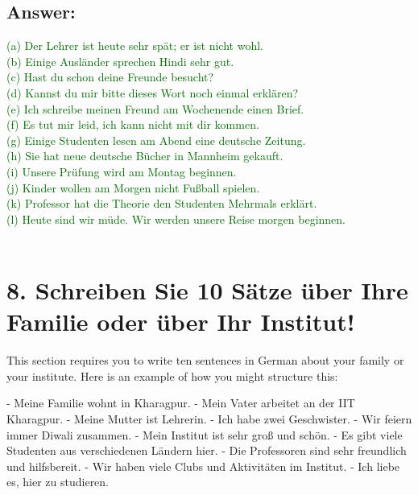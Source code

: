 \documentclass[a4paper,12pt]{article}
\begin{document}
\subsection*{Answer:}
\textcolor{darkgreen}{(a) Der Lehrer ist heute sehr spät; er ist nicht wohl.}\\
\textcolor{darkgreen}{(b) Einige Ausländer sprechen Hindi sehr gut.}\\
\textcolor{darkgreen}{(c) Hast du schon deine Freunde besucht?}\\
\textcolor{darkgreen}{(d) Kannst du mir bitte dieses Wort noch einmal erklären?}\\
\textcolor{darkgreen}{(e) Ich schreibe meinen Freund am Wochenende einen Brief.}\\
\textcolor{darkgreen}{(f) Es tut mir leid, ich kann nicht mit dir kommen.}\\
\textcolor{darkgreen}{(g) Einige Studenten lesen am Abend eine deutsche Zeitung.}\\
\textcolor{darkgreen}{(h) Sie hat neue deutsche Bücher in Mannheim gekauft.}\\
\textcolor{darkgreen}{(i) Unsere Prüfung wird am Montag beginnen.}\\
\textcolor{darkgreen}{(j) Kinder wollen am Morgen nicht Fußball spielen.}\\
\textcolor{darkgreen}{(k) Professor hat die Theorie den Studenten Mehrmals erklärt.}\\
\textcolor{darkgreen}{(l) Heute sind wir müde. Wir werden unsere Reise morgen beginnen.}\\
\

\vspace{1cm}

\section*{8. Schreiben Sie 10 Sätze über Ihre Familie oder über Ihr Institut!}

This section requires you to write ten sentences in German about your family or your institute. Here is an example of how you might structure this:

- Meine Familie wohnt in Kharagpur.
- Mein Vater arbeitet an der IIT Kharagpur.
- Meine Mutter ist Lehrerin.
- Ich habe zwei Geschwister.
- Wir feiern immer Diwali zusammen.
- Mein Institut ist sehr groß und schön.
- Es gibt viele Studenten aus verschiedenen Ländern hier.
- Die Professoren sind sehr freundlich und hilfsbereit.
- Wir haben viele Clubs und Aktivitäten im Institut.
- Ich liebe es, hier zu studieren.
\end{document}
